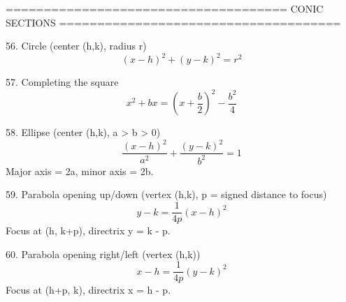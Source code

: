 =====================================
CONIC SECTIONS
=====================================
 
56. Circle  (center (h,k), radius r)
$$ (x - h)^2 + (y - k)^2 = r^2 $$
 
57. Completing the square
$$ x^2 + bx = \left( x + \frac{b}{2} \right)^2 - \frac{b^2}{4} $$
 
58. Ellipse  (center (h,k), a > b > 0)
$$ \frac{(x-h)^2}{a^2} + \frac{(y-k)^2}{b^2} = 1 $$
Major axis = 2a,   minor axis = 2b.
 
59. Parabola opening up/down  (vertex (h,k), p = signed distance to focus)
$$ y - k = \frac{1}{4p}(x - h)^2 $$
Focus at (h, k+p),   directrix  y = k - p.
 
60. Parabola opening right/left  (vertex (h,k))
$$ x - h = \frac{1}{4p}(y - k)^2 $$
Focus at (h+p, k),   directrix  x = h - p.
 
